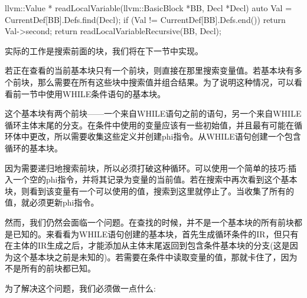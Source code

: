 \begin{cpp}
llvm::Value *
readLocalVariable(llvm::BasicBlock *BB, Decl *Decl) {
    auto Val = CurrentDef[BB].Defs.find(Decl);
    if (Val != CurrentDef[BB].Defs.end())
        return Val->second;
    return readLocalVariableRecursive(BB, Decl);
}
\end{cpp}

实际的工作是搜索前面的块，我们将在下一节中实现。


若正在查看的当前基本块只有一个前块，则直接在那里搜索变量值。若基本块有多个前块，那么需要在所有这些块中搜索值并组合结果。为了说明这种情况，可以看看前一节中使用WHILE条件语句的基本块。

这个基本块有两个前块——一个来自WHILE语句之前的语句，另一个来自WHILE循环主体末尾的分支。在条件中使用的变量应该有一些初始值，并且最有可能在循环体中更改，所以需要收集这些定义并创建phi指令。从WHILE语句创建一个包含循环的基本块。

因为需要递归地搜索前块，所以必须打破这种循环。可以使用一个简单的技巧:插入一个空的phi指令，并将其记录为变量的当前值。若在搜索中再次看到这个基本块，则看到该变量有一个可以使用的值，搜索到这里就停止了。当收集了所有的值，就必须更新phi指令。

然而，我们仍然会面临一个问题。在查找的时候，并不是一个基本块的所有前块都是已知的。来看看为WHILE语句创建的基本块，首先生成循环条件的IR，但只有在主体的IR生成之后，才能添加从主体末尾返回到包含条件基本块的分支(这是因为这个基本块之前是未知的)。若需要在条件中读取变量的值，那就卡住了，因为不是所有的前块都已知。

为了解决这个问题，我们必须做一点什么:

